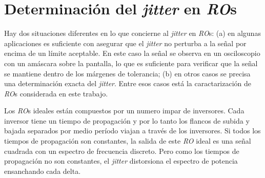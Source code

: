 \section{Determinación del \textit{jitter} en \emph{RO}s}
\label{sec:jitter}

Hay dos situaciones diferentes en lo que concierne al \textit{jitter} en \textit{RO}s:
(a) en algunas aplicaciones es suficiente con asegurar que el \textit{jitter} no perturba a la señal por encima de un límite aceptable.
En este caso la señal se observa en un osciloscopio con un amáscara sobre la pantalla, lo que es suficiente para verificar que la señal se mantiene dentro de los márgenes de tolerancia;
(b) en otros casos se precisa una determinación exacta del \textit{jitter}.
Entre esos casos está la caractarización de \textit{RO}s considerada en este trabajo.

Los \textit{RO}s ideales están compuestos por un numero impar de inversores.
Cada inversor tiene un tiempo de propagación y por lo tanto los flancos de subida y bajada separados por medio período viajan a través de los inversores.
Si todos los tiempos de propagación son constantes, la salida de este \textit{RO} ideal es una señal cuadrada con un espectro de frecuencia discreto.
Pero como los tiempos de propagación no son constantes, el \textit{jitter} distorsiona el espectro de potencia ensanchando cada delta.

